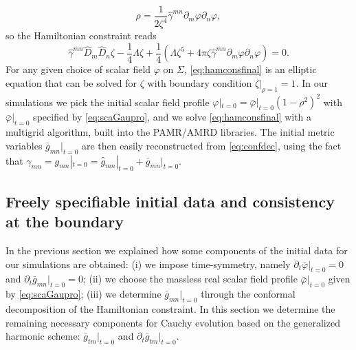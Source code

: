 \documentclass[a4paper,11pt]{article}
\numberwithin{equation}{section}
\begin{document}
\begin{equation}
\label{eq:mattendens}
\rho=\frac{1}{2\zeta^4}\hat{\gamma}^{mn}\partial_m\varphi\partial_n\varphi,
\end{equation}
so the Hamiltonian constraint reads
\begin{equation}
\label{eq:hamconsfinal}
\hat{\gamma}^{mn}\hat{D}_m \hat{D}_n \zeta-\frac{1}{4}\Lambda\zeta+\frac{1}{4}(\Lambda\zeta^5+4\pi\zeta\hat{\gamma}^{mn}\partial_m\varphi\partial_n\varphi)=0.
\end{equation}
For any given choice of scalar field $\varphi$ on $\Sigma$, \eqref{eq:hamconsfinal} is an elliptic equation that can be solved for $\zeta$ with boundary condition $\zeta|_{\rho=1}=1$. In our simulations we pick the initial scalar field profile $\varphi|_{t=0}=\bar{\varphi}|_{t=0}(1-\rho^2)^2$ with $\bar{\varphi}|_{t=0}$ specified by \eqref{eq:scaGaupro}, and we solve \eqref{eq:hamconsfinal} with a multigrid algorithm, built into the PAMR/AMRD libraries.
The initial metric variables $\bar{g}_{mn}|_{t=0}$ are then easily reconstructed from \eqref{eq:confdec}, using the fact that $\gamma_{mn}=g_{mn}|_{t=0}=\hat{g}_{mn}|_{t=0}+\bar{g}_{mn}|_{t=0}$.

\subsection{Freely specifiable initial data and consistency at the boundary}
\label{sec:consistbound}

In the previous section we explained how some components of the initial data for our simulations are obtained: (i) we impose time-symmetry, namely $\partial_t\bar{\varphi}|_{t=0}=0$ and $\partial_t\bar{g}_{mn}|_{t=0}=0$; (ii) we choose the massless real scalar field profile $\bar{\varphi}|_{t=0}$ given by \eqref{eq:scaGaupro}; (iii) we determine $\bar{g}_{mn}|_{t=0}$ through the conformal decomposition of the Hamiltonian constraint. In this section we determine the remaining necessary components for Cauchy evolution based on the generalized harmonic scheme: $\bar{g}_{t m}|_{t=0}$ and $\partial_t\bar{g}_{t m}|_{t=0}$.
\end{document}
